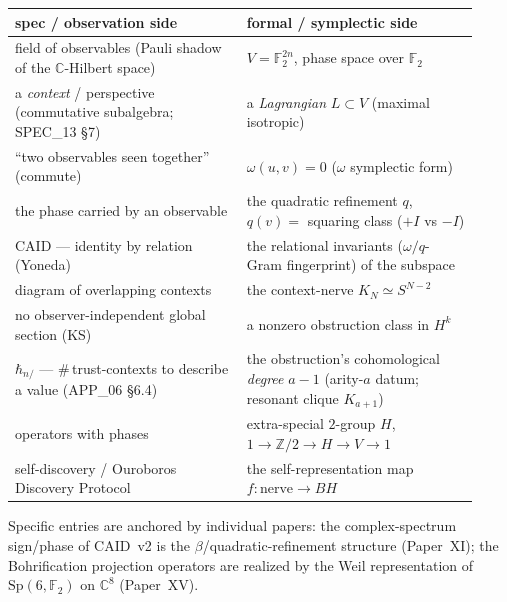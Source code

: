 \documentclass[11pt,a4paper]{article}
\newcommand{\Sp}{\mathrm{Sp}}
\newcommand{\F}{\mathbb{F}}
\newcommand{\Z}{\mathbb{Z}}
\newcommand{\C}{\mathbb{C}}
\newcommand{\hbarn}{\hbar_{n/}}
\theoremstyle{plain}
\theoremstyle{definition}
\theoremstyle{remark}
\begin{document}
\begin{center}
\renewcommand{\arraystretch}{1.32}
\begin{tabular}{>{\raggedright}p{0.46\linewidth} p{0.46\linewidth}}
\toprule
\textbf{spec / observation side} & \textbf{formal / symplectic side} \\
\midrule
field of observables (Pauli shadow of the $\C$-Hilbert space) &
$V=\F_2^{2n}$, phase space over $\F_2$ \\
a \emph{context} / perspective (commutative subalgebra; SPEC\_13 \S7) &
a \emph{Lagrangian} $L\subset V$ (maximal isotropic) \\
``two observables seen together'' (commute) &
$\omega(u,v)=0$ ($\omega$ symplectic form) \\
the phase carried by an observable &
the quadratic refinement $q$, $q(v)=$ squaring class ($+I$ vs $-I$) \\
CAID --- identity by relation (Yoneda) &
the relational invariants ($\omega/q$-Gram fingerprint) of the subspace \\
diagram of overlapping contexts &
the context-nerve $K_N\simeq S^{N-2}$ \\
no observer-independent global section (KS) &
a nonzero obstruction class in $H^{k}$ \\
$\hbarn$ --- \#\,trust-contexts to describe a value (APP\_06 \S6.4) &
the obstruction's cohomological \emph{degree} $a-1$ (arity-$a$ datum;
resonant clique $K_{a+1}$) \\
operators with phases &
extra-special $2$-group $H$, $1\!\to\!\Z/2\!\to\!H\!\to\!V\!\to\!1$ \\
self-discovery / Ouroboros Discovery Protocol &
the self-representation map $f:\text{nerve}\to BH$ \\
\bottomrule
\end{tabular}
\end{center}

Specific entries are anchored by individual papers: the complex-spectrum
sign/phase of CAID~v2 is the $\beta$/quadratic-refinement structure (Paper~XI);
the Bohrification projection operators are realized by the Weil representation of
$\Sp(6,\F_2)$ on $\C^8$ (Paper~XV).
\end{document}
